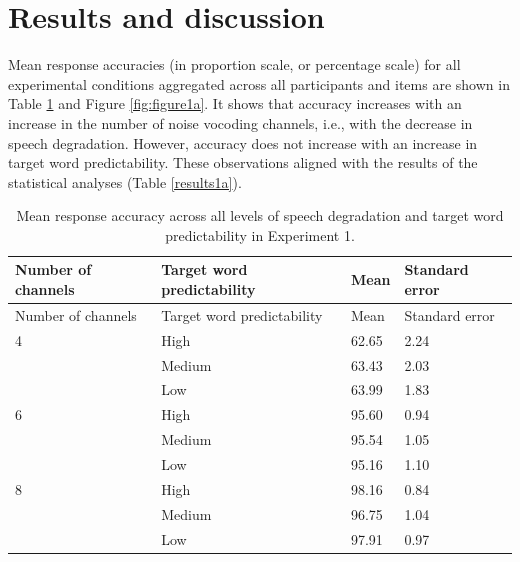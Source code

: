 \documentclass[a4paper, nobind]{templates/ociamthesis}
\begin{document}
\hypertarget{results-and-discussion}{%
\section{Results and discussion}\label{results-and-discussion}}

Mean response accuracies (in proportion scale, or percentage scale) for all experimental conditions aggregated across all participants and items are shown in Table \ref{summary1a} and Figure \ref{fig:figure1a}.
It shows that accuracy increases with an increase in the number of noise vocoding channels, i.e., with the decrease in speech degradation.
However, accuracy does not increase with an increase in target word predictability.
These observations aligned with the results of the statistical analyses (Table \ref{results1a}).

\begin{longtable}[]{@{}llll@{}}
\caption{Mean response accuracy across all levels of speech degradation
and target word predictability in Experiment 1.}
\label{summary1a}
\tabularnewline
\toprule
Number of channels & Target word predictability & Mean & Standard
error \\
\midrule
\endfirsthead
\toprule
Number of channels & Target word predictability & Mean & Standard
error \\
\midrule
\endhead
4 & High & 62.65 & 2.24 \\
& Medium & 63.43 & 2.03 \\
& Low & 63.99 & 1.83 \\
6 & High & 95.60 & 0.94 \\
& Medium & 95.54 & 1.05 \\
& Low & 95.16 & 1.10 \\
8 & High & 98.16 & 0.84 \\
& Medium & 96.75 & 1.04 \\
& Low & 97.91 & 0.97 \\
\bottomrule
\end{longtable}
\end{document}
